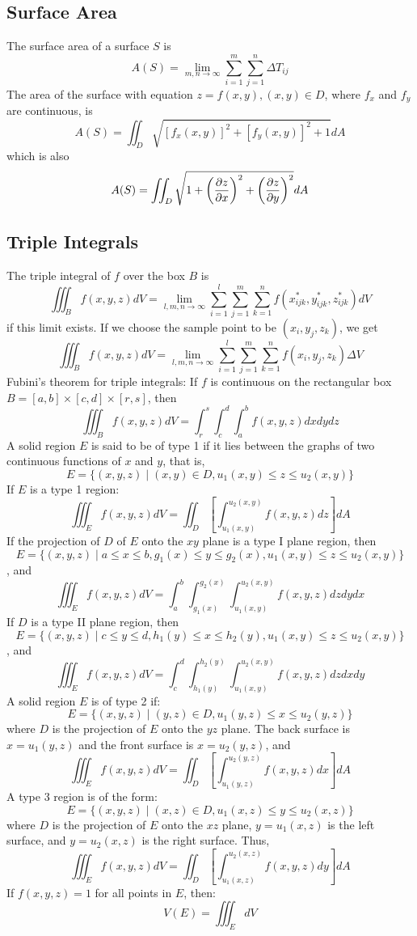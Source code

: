 \documentclass{article}
\begin{document}
    \subsection{Surface Area}
    \begin{outline}
        \1 The surface area of a surface $S$ is \[A(S)=\lim_{m,n\to\infty}\sum^m_{i=1}\sum^n_{j=1}\Delta T_{ij}\]
        \1 The area of the surface with equation \(z=f(x,y),(x,y)\in D\), where \(f_x\) and \(f_y\) are continuous, is \[A(S)=\iint_D\sqrt{[f_x(x,y)]^2+[f_y(x,y)]^2+1}dA\] which is also \[A(S)=\iint_D\sqrt{1+\left(\pdv{z}{x}\right)^2+\left(\pdv{z}{y}\right)^2}dA\]

    \end{outline}
    \subsection{Triple Integrals}
    \begin{outline}
        \1 The triple integral of $f$ over the box $B$ is \[\iiint_Bf(x,y,z)dV=\lim_{l,m,n\to\infty}\sum^l_{i=1}\sum^m_{j=1}\sum^n_{k=1}f(x^*_{ijk},y^*_{ijk},z^*_{ijk})dV\] if this limit exists. 
        \1 If we choose the sample point to be \((x_i,y_j,z_k)\), we get \[\iiint_Bf(x,y,z)dV=\lim_{l,m,n\to\infty}\sum^l_{i=1}\sum^m_{j=1}\sum^n_{k=1}f(x_i,y_j,z_k)\Delta V\]
        \1 Fubini's theorem for triple integrals: If $f$ is continuous on the rectangular box \(B=[a,b]\times[c,d]\times[r,s]\),  then \[\iiint_Bf(x,y,z)dV=\int^s_r\int^d_c\int^b_af(x,y,z)dxdydz\]
        \1 A solid region $E$ is said to be of type 1 if it lies between the graphs of two continuous functions of $x$ and $y$, that is, \[E=\{(x,y,z)\;|\;(x,y)\in D, u_1(x,y)\leq z\leq u_2(x,y)\}\]
        \1 If $E$ is a type 1 region: \[\iiint_Ef(x,y,z)dV=\iint_D\left[\int^{u_2(x,y)}_{u_1(x,y)}f(x,y,z)dz\right]dA\]
        \1 If the projection of $D$ of $E$ onto the $xy$ plane is a type I plane region, then \[E=\{(x,y,z)\;|\;a\leq x\leq b, g_1(x)\leq y\leq g_2(x), u_1(x,y)\leq z\leq u_2(x,y)\}\], and \[\iiint_Ef(x,y,z)dV=\int^b_a\int^{g_2(x)}_{g_1(x)}\int^{u_2(x,y)}_{u_1(x,y)}f(x,y,z)dzdydx\]
        \1 If $D$ is a type II plane region, then \[E=\{(x,y,z)\;|\;c\leq y\leq d, h_1(y)\leq x \leq h_2(y),u_1(x,y)\leq z\leq u_2(x,y)\}\], and \[\iiint_Ef(x,y,z)dV=\int_c^d\int_{h_1(y)}^{h_2(y)}\int_{u_1(x,y)}^{u_2(x,y)}f(x,y,z)dzdxdy\]
        \1 A solid region $E$ is of type 2 if: \[E=\{(x,y,z)\;|\;(y,z)\in D,u_1(y,z)\leq x\leq u_2(y,z)\}\] where $D$ is the projection of $E$ onto the $yz$ plane. The back surface is \(x=u_1(y,z)\) and the front surface is \(x=u_2(y,z)\), and \[\iiint_Ef(x,y,z)dV=\iint_D\left[\int_{u_1(y,z)}^{u_2(y,z)}f(x,y,z)dx\right]dA\]
        \1 A type 3 region is of the form: \[E=\{(x,y,z)\;|\;(x,z)\in D, u_1(x,z)\leq y\leq u_2(x,z)\}\] where $D$ is the projection of $E$ onto the $xz$ plane, \(y=u_1(x,z)\) is the left surface, and \(y=u_2(x,z)\) is the right surface. Thus, \[\iiint_Ef(x,y,z)dV=\iint_D\left[\int_{u_1(x,z)}^{u_2(x,z)}f(x,y,z)dy\right]dA\]
        \1 If \(f(x,y,z)=1\) for all points in $E$, then: \[V(E)=\iiint_EdV\]
    \end{outline}
\end{document}
